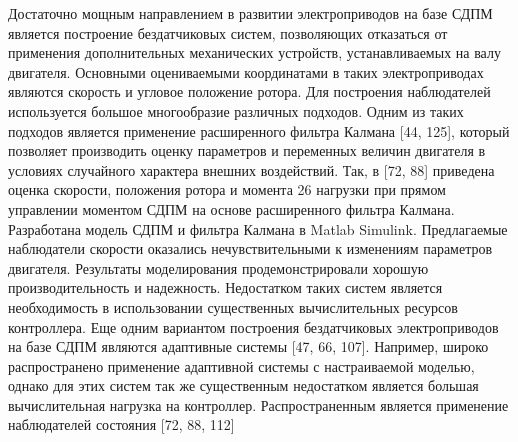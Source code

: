 Достаточно мощным направлением в развитии электроприводов на базе СДПМ является построение бездатчиковых систем, позволяющих отказаться от применения дополнительных механических устройств, устанавливаемых на валу двигателя. Основными оцениваемыми координатами в таких электроприводах являются скорость и угловое положение ротора. Для построения наблюдателей используется большое многообразие различных подходов. 
Одним из таких подходов является применение расширенного фильтра Калмана [44, 125], который позволяет производить оценку параметров и переменных величин двигателя в условиях случайного характера внешних воздействий. Так, в [72, 88] приведена оценка скорости, положения ротора и момента 26 нагрузки при прямом управлении моментом СДПМ на основе расширенного фильтра Калмана. Разработана модель СДПМ и фильтра Калмана в Matlab Simulink. Предлагаемые наблюдатели скорости оказались нечувствительными к изменениям параметров двигателя. Результаты моделирования продемонстрировали хорошую производительность и надежность. Недостатком таких систем является необходимость в использовании существенных вычислительных ресурсов контроллера. 
Еще одним вариантом построения бездатчиковых электроприводов на базе СДПМ являются адаптивные системы [47, 66, 107]. Например, широко распространено применение адаптивной системы с настраиваемой моделью, однако для этих систем так же существенным недостатком является большая вычислительная нагрузка на контроллер. 
Распространенным является применение наблюдателей состояния [72, 88, 112]